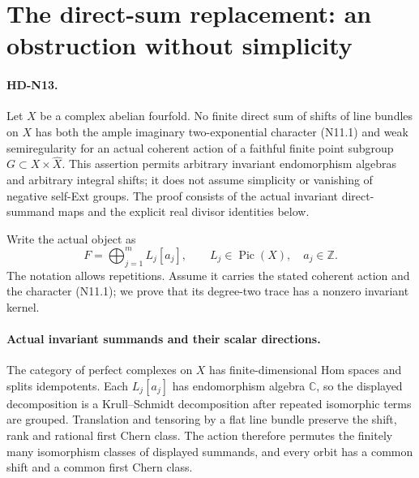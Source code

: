 \section{The direct-sum replacement: an obstruction without simplicity}

\paragraph{HD-N13.}
Let $X$ be a complex abelian fourfold. No finite direct sum of
shifts of line bundles on $X$ has both the ample imaginary
two-exponential character (N11.1) and weak semiregularity for an
actual coherent action of a faithful finite point subgroup
$G\subset X\times\widehat X$.
This assertion permits arbitrary invariant endomorphism algebras
and arbitrary integral shifts; it does not assume simplicity or
vanishing of negative self-Ext groups. The proof consists of the
actual invariant direct-summand maps and the explicit real
divisor identities below.

Write the actual object as
\[
 F=\bigoplus_{j=1}^m L_j[a_j],
 \qquad L_j\in\operatorname{Pic}(X),\quad a_j\in\mathbb Z.
                                                               \tag{N13.1}
\]
The notation allows repetitions. Assume it carries the stated
coherent action and the character (N11.1); we prove that its
degree-two trace has a nonzero invariant kernel.

\paragraph{Actual invariant summands and their scalar directions.}
The category of perfect complexes on $X$ has finite-dimensional
Hom spaces and splits idempotents. Each $L_j[a_j]$ has
endomorphism algebra $\mathbb C$, so the displayed decomposition
is a Krull--Schmidt decomposition after repeated isomorphic
terms are grouped. Translation and tensoring by a flat line
bundle preserve the shift, rank and rational first Chern class.
The action therefore permutes the finitely many isomorphism
classes of displayed summands, and every orbit has a common
shift and a common first Chern class.

